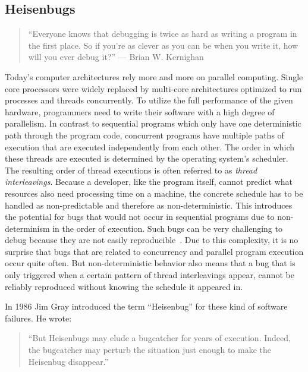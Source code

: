\documentclass[conference]{IEEEtran}
\begin{document}
\subsection{Heisenbugs}

\begin{quote}
``Everyone knows that debugging is twice as hard as writing a program in the first place. So if you're as clever as you can be when you write it, how will you ever debug it?'' --- Brian W. Kernighan\cite{kernighan1974elements}
\end{quote}

Today's computer architectures rely more and more on parallel computing.
Single core processors were widely replaced by multi-core architectures optimized to run processes and threads concurrently.
To utilize the full performance of the given hardware, programmers need to write their software with a high degree of parallelism.
In contrast to sequential programs which only have one deterministic path through the program code, concurrent programs have multiple paths of execution that are executed independently from each other.
The order in which these threads are executed is determined by the operating system's scheduler.
The resulting order of thread executions is often referred to as \emph{thread interleavings}.
Because a developer, like the program itself, cannot predict what resources also need processing time on a machine, the concrete schedule has to be handled as non-predictable and therefore as non-deterministic.
This introduces the potential for bugs that would not occur in sequential programs due to non-determinism in the order of execution.
Such bugs can be very challenging to debug because they are not easily reproducible~\cite{tu2019go}.
Due to this complexity, it is no surprise that bugs that are related to concurrency and parallel program execution occur quite often.
But non-deterministic behavior also means that a bug that is only triggered when a certain pattern of thread interleavings appear, cannot be reliably reproduced without knowing the schedule it appeared in.

In 1986 Jim Gray introduced the term ``Heisenbug'' for these kind of software failures.
He wrote:

\begin{quote}
``But Heisenbugs may elude a bugcatcher for years of execution. Indeed, the bugcatcher may perturb the situation just enough to make the Heisenbug disappear.''\cite{gray1986computers}
\end{quote}
\end{document}
